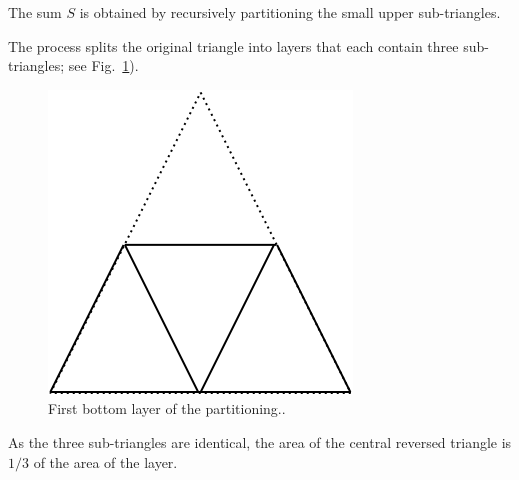 \begin{itemize}
\smallskip

The sum $S$ is obtained by recursively partitioning the small upper sub-triangles. 

The process splits the original triangle into layers that each contain three sub-triangles; see
Fig.~\ref{Fig:Sum1over4FirstLayer}). 
\begin{figure}
\begin{center}
        \includegraphics[scale=0.3]{FiguresMaths/Sum1over4FirstLayer}
        \caption{First bottom layer of the partitioning..}
        \label{Fig:Sum1over4FirstLayer}
\end{center}
\end{figure}
As the three sub-triangles are identical, the area of the central reversed triangle is $1/3$ of the area of the layer. 

\smallskip


\end{itemize}
